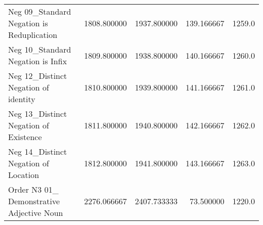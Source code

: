 \begin{tabular}{lrrrr}
Neg 09\_Standard Negation is Reduplication          &  1808.800000 &  1937.800000 &  139.166667 &       1259.0 \\
Neg 10\_Standard Negation is Infix                  &  1809.800000 &  1938.800000 &  140.166667 &       1260.0 \\
Neg 12\_Distinct Negation of identity               &  1810.800000 &  1939.800000 &  141.166667 &       1261.0 \\
Neg 13\_Distinct Negation of Existence              &  1811.800000 &  1940.800000 &  142.166667 &       1262.0 \\
Neg 14\_Distinct Negation of Location               &  1812.800000 &  1941.800000 &  143.166667 &       1263.0 \\
Order N3 01\_ Demonstrative Adjective Noun          &  2276.066667 &  2407.733333 &   73.500000 &       1220.0 \\
\bottomrule
\end{tabular}

